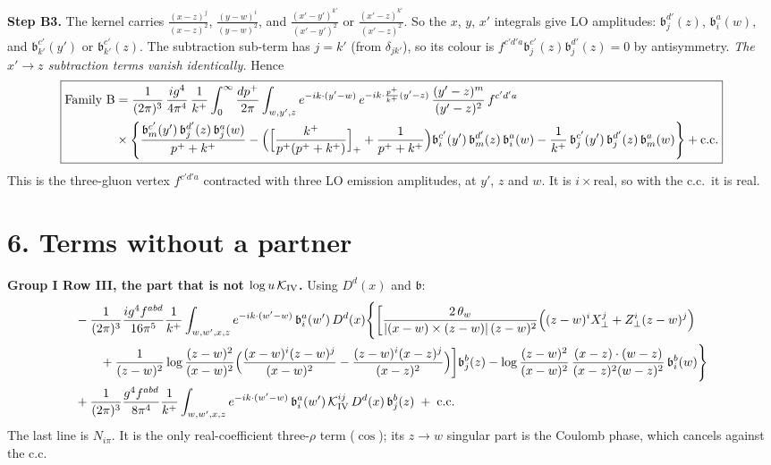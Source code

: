 \documentclass[10pt]{article}
\begin{document}
\noindent\textbf{Step B3.} The kernel carries $\frac{(x-z)^{j}}{(x-z)^{2}}$, $\frac{(y-w)^{i}}{(y-w)^{2}}$, and $\frac{(x'-y')^{k'}}{(x'-y')^{2}}$ or $\frac{(x'-z)^{k'}}{(x'-z)^{2}}$. So the $x$, $y$, $x'$ integrals give LO amplitudes: $\mathfrak b^{d'}_{j}(z)$, $\mathfrak b^{a}_{i}(w)$, and $\mathfrak b^{c'}_{k'}(y')$ or $\mathfrak b^{c'}_{k'}(z)$. The subtraction sub-term has $j=k'$ (from $\delta_{jk'}$), so its colour is $f^{c'd'a}\mathfrak b^{c'}_{j}(z)\mathfrak b^{d'}_{j}(z)=0$ by antisymmetry. \emph{The $x'\to z$ subtraction terms vanish identically.} Hence
\begin{align}
\boxed{\begin{aligned}
\text{Family B}&=\frac{1}{(2\pi)^{3}}\,\frac{ig^{4}}{4\pi^{4}}\,\frac{1}{k^{+}}\int_{0}^{\infty}\frac{dp^{+}}{2\pi}\int_{w,y',z}e^{-ik\cdot(y'-w)}\,e^{-ik\cdot\frac{p^{+}}{k^{+}}(y'-z)}\,\frac{(y'-z)^{m}}{(y'-z)^{2}}\,f^{c'd'a}\\
&\times\Bigg\{\frac{\mathfrak b^{c'}_{m}(y')\,\mathfrak b^{d'}_{j}(z)\,\mathfrak b^{a}_{j}(w)}{p^{+}+k^{+}}-\Big(\Big[\frac{k^{+}}{p^{+}(p^{+}+k^{+})}\Big]_{+}+\frac{1}{p^{+}+k^{+}}\Big)\mathfrak b^{c'}_{i}(y')\,\mathfrak b^{d'}_{m}(z)\,\mathfrak b^{a}_{i}(w)
-\frac{1}{k^{+}}\,\mathfrak b^{c'}_{j}(y')\,\mathfrak b^{d'}_{j}(z)\,\mathfrak b^{a}_{m}(w)\Bigg\}+{\rm c.c.}
\end{aligned}}
\end{align}
This is the three-gluon vertex $f^{c'd'a}$ contracted with three LO emission amplitudes, at $y'$, $z$ and $w$. It is $i\times$real, so with the c.c.\ it is real.

\section*{6. Terms without a partner}
\textbf{Group I Row III, the part that is not $\log u\,\mathcal K_{\rm IV}$.} Using $D^{d}(x)$ and $\mathfrak b$:
\begin{align}
&-\frac{1}{(2\pi)^{3}}\frac{ig^{4}f^{abd}}{16\pi^{5}}\frac{1}{k^{+}}\int_{w,w',x,z}e^{-ik\cdot(w'-w)}\,\mathfrak b^{a}_{i}(w')\,D^{d}(x)\Bigg\{\bigg[\frac{2\,\theta_{w}}{|(x-w)\times(z-w)|\,(z-w)^{2}}\Big((z-w)^{i}X_{\perp}^{j}+Z_{\perp}^{i}(z-w)^{j}\Big)\notag\\
&\qquad+\frac{1}{(z-w)^{2}}\log\frac{(z-w)^{2}}{(x-w)^{2}}\Big(\frac{(x-w)^{i}(z-w)^{j}}{(x-w)^{2}}-\frac{(z-w)^{i}(x-z)^{j}}{(x-z)^{2}}\Big)\bigg]\mathfrak b^{b}_{j}(z)
-\log\frac{(z-w)^{2}}{(x-w)^{2}}\,\frac{(x-z)\cdot(w-z)}{(x-z)^{2}(w-z)^{2}}\,\mathfrak b^{b}_{i}(w)\Bigg\}\notag\\
&+\frac{1}{(2\pi)^{3}}\frac{g^{4}f^{abd}}{8\pi^{4}}\frac{1}{k^{+}}\int_{w,w',x,z}e^{-ik\cdot(w'-w)}\,\mathfrak b^{a}_{i}(w')\,\mathcal K^{ij}_{\rm IV}\,D^{d}(x)\,\mathfrak b^{b}_{j}(z)\;+\;{\rm c.c.}
\end{align}
The last line is $N_{i\pi}$. It is the only real-coefficient three-$\rho$ term ($\cos$); its $z\to w$ singular part is the Coulomb phase, which cancels against the c.c.
\end{document}
